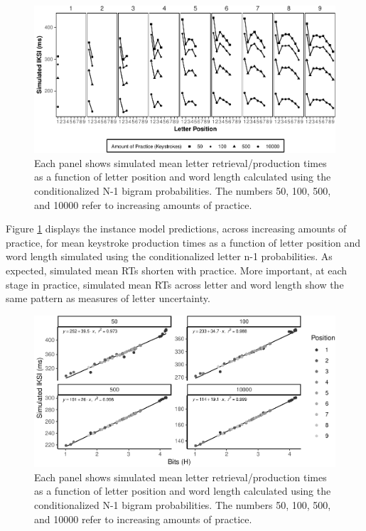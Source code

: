 \documentclass[,man,floatsintext]{apa6}
\begin{document}
\begin{figure}
\centering
\includegraphics{v2-manuscript_files/figure-latex/figure5-1.pdf}
\caption{\label{fig:figure5}Each panel shows simulated mean letter retrieval/production times as a function of letter position and word length calculated using the conditionalized N-1 bigram probabilities. The numbers 50, 100, 500, and 10000 refer to increasing amounts of practice.}
\end{figure}



Figure \ref{fig:figure5} displays the instance model predictions, across increasing amounts of practice, for mean keystroke production times as a function of letter position and word length simulated using the conditionalized letter n-1 probabilities. As expected, simulated mean RTs shorten with practice. More important, at each stage in practice, simulated mean RTs across letter and word length show the same pattern as measures of letter uncertainty.

\begin{figure}
\centering
\includegraphics{v2-manuscript_files/figure-latex/figureInstanceBits-1.pdf}
\caption{\label{fig:figureInstanceBits}Each panel shows simulated mean letter retrieval/production times as a function of letter position and word length calculated using the conditionalized N-1 bigram probabilities. The numbers 50, 100, 500, and 10000 refer to increasing amounts of practice.}
\end{figure}
\end{document}
